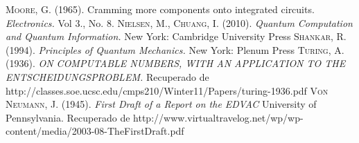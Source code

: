 \documentclass[11pt,a4paper]{article}
\begin{document}
\begin{thebibliography}{X}
 \textsc{Moore, G.} (1965). Cramming more components onto integrated circuits. \textit{Electronics.} Vol 3., No. 8.
 \textsc{Nielsen, M., Chuang, I.} (2010). \textit{Quantum Computation and Quantum Information.} New York: Cambridge University Press
 \textsc{Shankar, R.} (1994). \textit{Principles of Quantum Mechanics.} New York: Plenum Press
 \textsc{Turing, A.} (1936). \textit{ON COMPUTABLE NUMBERS, WITH AN APPLICATION TO
THE ENTSCHEIDUNGSPROBLEM.} Recuperado de http://classes.soe.ucsc.edu/cmps210/Winter11/Papers/turing-1936.pdf
 \textsc{Von Neumann, J.} (1945). \textit{First Draft of a Report on the EDVAC} University of Pennsylvania. Recuperado de http://www.virtualtravelog.net/wp/wp-content/media/2003-08-TheFirstDraft.pdf
\end{thebibliography}
\end{document}
